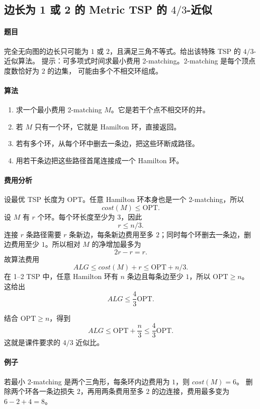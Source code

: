 \documentclass[UTF8,openany,12pt]{ctexbook}
\theoremstyle{remark}
\newcommand{\OPT}{\mathrm{OPT}}
\begin{document}
\subsection[边长为 1 或 2 的 Metric TSP 的 4/3-近似]{边长为 1 或 2 的 Metric TSP 的 $4/3$-近似}

\paragraph{题目}
完全无向图的边长只可能为 $1$ 或 $2$，且满足三角不等式。给出该特殊 TSP 的 $4/3$-近似算法。
提示：可多项式时间求最小费用 2-matching。2-matching 是每个顶点度数恰好为 $2$ 的边集，
可能由多个不相交环组成。

\paragraph{算法}
\begin{enumerate}
  \item 求一个最小费用 2-matching $M$。它是若干个点不相交环的并。
  \item 若 $M$ 只有一个环，它就是 Hamilton 环，直接返回。
  \item 若有多个环，从每个环中删去一条边，把这些环断成路径。
  \item 用若干条边把这些路径首尾连接成一个 Hamilton 环。
\end{enumerate}

\paragraph{费用分析}
设最优 TSP 长度为 $\OPT$。任意 Hamilton 环本身也是一个 2-matching，所以
\[
  cost(M)\le \OPT.
\]
设 $M$ 有 $r$ 个环。每个环长度至少为 $3$，因此
\[
  r\le n/3.
\]
连接 $r$ 条路径需要 $r$ 条新边，每条新边费用至多 $2$；同时每个环删去一条边，删边费用至少
$1$。所以相对 $M$ 的净增加最多为
\[
  2r-r=r.
\]
故算法费用
\[
  ALG\le cost(M)+r\le \OPT+n/3.
\]
在 1--2 TSP 中，任意 Hamilton 环有 $n$ 条边且每条边至少 $1$，所以 $\OPT\ge n$。
这给出
\[
  ALG\le \frac43\OPT.
\]

结合 $\OPT\ge n$，得到
\[
  ALG\le \OPT+\frac n3\le \frac43\OPT.
\]
这就是课件要求的 $4/3$ 近似比。

\paragraph{例子}
若最小 2-matching 是两个三角形，每条环内边费用为 $1$，则 $cost(M)=6$。
删除两个环各一条边损失 $2$，再用两条费用至多 $2$ 的边连接，费用最多变为
$6-2+4=8$。
\end{document}
